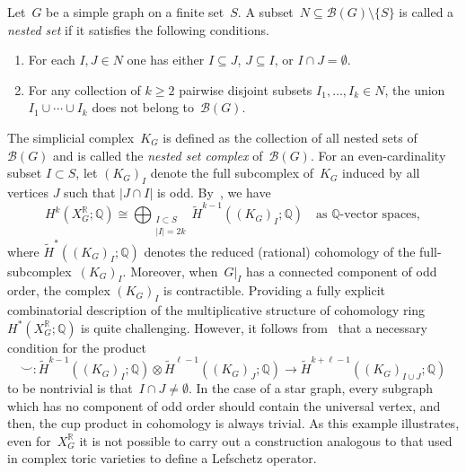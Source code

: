 \documentclass[10pt]{amsart}
\theoremstyle{plain}
\numberwithin{equation}{section}
\theoremstyle{definition}
\newcommand{\B}{\mathcal{B}}
\newcommand{\Q}{\mathbb{Q}}
\newcommand{\R}{\mathbb{R}}
\begin{document}
Let~$G$ be a simple graph on a finite set~$S$.
A subset~$N \subseteq \B(G) \setminus \{S\}$ is called a \emph{nested set} if it satisfies the following conditions.
\begin{enumerate}
  \item For each $I,J \in N$ one has either $I \subseteq J$, $J \subseteq I$, or $I \cap J = \emptyset$.
  \item For any collection of $k \geq 2$ pairwise disjoint subsets $I_1,\ldots,I_k \in N$, the union $I_1 \cup \cdots \cup I_k$ does not belong to~$\B(G)$.
\end{enumerate}
The simplicial complex~$K_G$ is defined as the collection of all nested sets of~$\B(G)$ and is called the \emph{nested set complex} of~$\B(G)$.
For an even-cardinality subset $I \subset S$, let $(K_G)_I$ denote the full subcomplex of~$K_G$ induced by all vertices $J$ such that $|J \cap I|$ is odd.
By~\cite{Choi-Park2015,Choi-Park2017_torsion}, we have
\begin{equation}\label{Betti_comp}
  H^k(X_G^\R;\Q) \cong \bigoplus_{\substack{I \subset S \\ \left\vert I \right\vert =2k}} \widetilde{H}^{k-1} ((K_G)_I;\Q) \quad \text{as $\Q$-vector spaces},
\end{equation}
where $\widetilde{H}^\ast((K_G)_I;\Q)$ denotes the reduced (rational) cohomology of the full-subcomplex~$(K_G)_I$.
Moreover, when~$G|_I$ has a connected component of odd order, the complex $(K_G)_I$ is contractible.
Providing a fully explicit combinatorial description of the multiplicative
structure of cohomology ring~$H^\ast(X_G^\R;\Q)$ is quite challenging.
However, it follows from~\cite{Choi-Park2017_multiplicative} that a necessary condition for the product
$$
\smile \colon \widetilde{H}^{k-1} ((K_G)_I;\Q) \otimes \widetilde{H}^{\ell-1} ((K_G)_J;\Q) \to \widetilde{H}^{k+\ell-1} ((K_G)_{I \cup J};\Q)
$$
to be nontrivial is that~$I \cap J \neq \emptyset$.
In the case of a star graph, every subgraph which has no component of odd order should contain the universal vertex, and then, the cup product in cohomology is always trivial.
As this example illustrates, even for~$X^\R_G$ it is not possible to carry out a construction analogous to that used in complex toric varieties to define a Lefschetz operator.
\end{document}
